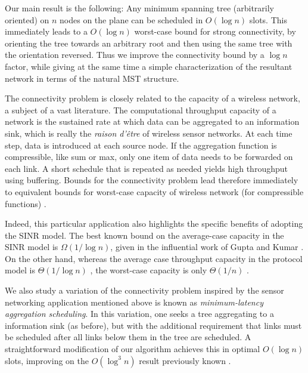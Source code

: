 \documentclass[11pt]{amsart}
\begin{document}
Our main result is the following: Any minimum spanning tree
(arbitrarily oriented) on $n$ nodes on the plane can be scheduled in
$O(\log n)$ slots. This immediately leads to a $O(\log n)$ worst-case
bound for strong connectivity, by orienting the tree towards an arbitrary
root and then using the same tree with the orientation reversed.
Thus we improve the connectivity bound by a $\log n$ factor, while 
giving at the same time a simple characterization of the resultant network in
terms of the natural MST structure.

The connectivity problem is closely related to the capacity of a
wireless network, a subject of a vast literature.
The computational throughput capacity of a network is the sustained
rate at which data can be aggregated to an information sink, which is
really the \emph{raison d'\^etre} of wireless sensor networks.  
At each time step, data is introduced at each source node.
If the aggregation function is compressible, like sum or max, 
only one item of data needs to be forwarded on each link.
A short schedule that is repeated as needed yields high throughput using buffering.  
Bounds for the connectivity problem lead therefore immediately to
equivalent bounds for worst-case capacity of wireless network (for
compressible functions) \cite{Moscibroda07}.

\iffalse
Apart from being the most basic and important network structure,
wireless connectivity immediately leads to interesting
applications. To highlight just one, connectivity structures provide
bounds for worst-case capacity in wireless sensor data gathering
applications. 
The computational throughput capacity of a network is the sustained
rate at which data can be aggregated to an information sink, which is
really the \emph{raison d'\^etre} of wireless sensor networks.  Bounds
for the the connectivity problem immediately lead to equivalent bounds
for the data aggregation problem (for compressible functions like sum
and max) \cite{Moscibroda07}.
\fi

Indeed, this particular application also 
highlights the specific benefits of adopting the SINR model.  The best
known bound on the average-case capacity in the SINR model is
$\Omega(1/\log n)$, given in the influential work of Gupta and Kumar
\cite{Kumar00}.  On the other
hand, whereas the average case throughput capacity in the protocol model is
$\Theta(1/\log n)$ \cite{Kumar00}, the worst-case capacity
is only $\Theta(1/n)$ \cite{Moscibroda07}.

We also study a variation of the connectivity problem inspired by the
sensor networking application mentioned above is known as
\emph{minimum-latency aggregation scheduling}. In this variation, one
seeks a tree aggregating to a information sink (as before), but with
the additional requirement that links must be scheduled after all
links below them in the tree are scheduled.  
A straightforward modification of our algorithm achieves this in
optimal $O(\log n)$ slots, improving on the $O(\log^3 n)$ result previously known \cite{Li:2010:MAS:1868521.1868581}.
\end{document}
